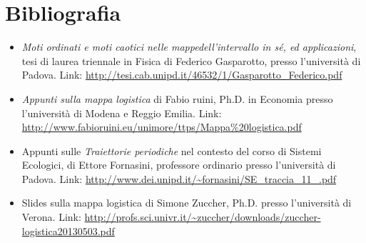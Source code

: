 \documentclass{article}
\theoremstyle{teorema}
\theoremstyle{definizione}
\begin{document}
\section{Bibliografia}
\begin{itemize}
    \item \textit{Moti ordinati e moti caotici nelle mappedell’intervallo in sé, ed applicazioni}, tesi di laurea triennale in Fisica di Federico Gasparotto, presso l'università di Padova. Link: \url{http://tesi.cab.unipd.it/46532/1/Gasparotto_Federico.pdf}
    \item \textit{Appunti sulla mappa logistica} di Fabio ruini, Ph.D. in Economia presso l'università di Modena e Reggio Emilia. Link: \url{http://www.fabioruini.eu/unimore/ttps/Mappa%20logistica.pdf}
    \item Appunti sulle \textit{Traiettorie periodiche} nel contesto del corso di Sistemi Ecologici, di Ettore Fornasini, professore ordinario presso l'università di Padova. Link: \url{http://www.dei.unipd.it/~fornasini/SE_traccia_11_.pdf}
    \item Slides sulla mappa logistica di Simone Zuccher, Ph.D. presso l'università di Verona. Link: \url{http://profs.sci.univr.it/~zuccher/downloads/zuccher-logistica20130503.pdf}
\end{itemize}
\end{document}
